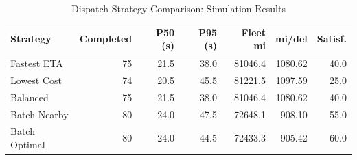 \begin{table}[htbp]
\centering
\caption{Dispatch Strategy Comparison: Simulation Results}
\label{tab:strategy-results}
\begin{tabular}{lrrrrrr}
\hline
\textbf{Strategy} & \textbf{Completed} & \textbf{P50 (s)} & \textbf{P95 (s)} & \textbf{Fleet mi} & \textbf{mi/del} & \textbf{Satisf.} \\
\hline
Fastest ETA & 75 & 21.5 & 38.0 & 81046.4 & 1080.62 & 40.0 \\
Lowest Cost & 74 & 20.5 & 45.5 & 81221.5 & 1097.59 & 25.0 \\
Balanced & 75 & 21.5 & 38.0 & 81046.4 & 1080.62 & 40.0 \\
Batch Nearby & 80 & 24.0 & 47.5 & 72648.1 & 908.10 & 55.0 \\
Batch Optimal & 80 & 24.0 & 44.5 & 72433.3 & 905.42 & 60.0 \\
\hline
\end{tabular}
\end{table}